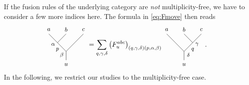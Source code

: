 If the fusion rules of the underlying category are \emph{not} multiplicity-free, we have to consider a few more indices here. The formula in \cref{eq:Fmove} then reads
	\begin{equation}
	\label{eq:Fmovemult}
		\begin{tikzpicture}[baseline=(current bounding box.center),yscale=0.9,xscale=0.9]
			\draw (0,0.5) -- (0,1);
			\draw (0,1) -- (-0.5,1.5);
			\draw (-0.5,1.5) -- (-1,2);
			\draw (-0.5,1.5) -- (0,2);
			\draw (0,1) -- (0.5,1.5);
			\draw (0.5,1.5) -- (1,2);
			\node at (0,0.25) {\small $u$};
			\node at (-1,2.25) {\small $a$};
			\node at (0,2.25) {\small $b$};
			\node at (1,2.25) {\small $c$};
			\node at (-0.5,1.1) {\footnotesize $p$};
			\node at (-0.75,1.4) {\footnotesize $\alpha$};
			\node at (-0.25,0.8) {\footnotesize $\beta$};
		\end{tikzpicture}=\sum_{q,\gamma,\delta} \left(F_u^{abc}\right)_{(q,\gamma,\delta)(p,\alpha,\beta)}
		\begin{tikzpicture}[baseline=(current bounding box.center),yscale=0.9,xscale=0.9]
			\draw (0,0.5) -- (0,1);
			\draw (0,1) -- (-0.5,1.5);
			\draw (-0.5,1.5) -- (-1,2);
			\draw (0.5,1.5) -- (0,2);
			\draw (0,1) -- (0.5,1.5);
			\draw (0.5,1.5) -- (1,2);
			\node at (0,0.25) {\small $u$};
			\node at (-1,2.25) {\small $a$};
			\node at (0,2.25) {\small $b$};
			\node at (1,2.25) {\small $c$};
			\node at (0.5,1.1) {\footnotesize $q$};
			\node at (0.75,1.4) {\footnotesize $\gamma$};
			\node at (0.25,0.8) {\footnotesize $\delta$};
		\end{tikzpicture}.
	\end{equation}
In the following, we restrict our studies to the multiplicity-free case.


